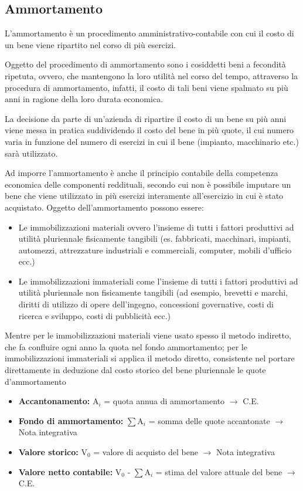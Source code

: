 \subsection{Ammortamento}
L'ammortamento è un procedimento amministrativo-contabile con cui il costo di un bene viene ripartito nel corso di più esercizi.

Oggetto del procedimento di ammortamento sono i cosiddetti beni a fecondità ripetuta, ovvero, che mantengono la loro utilità nel corso del tempo, attraverso la procedura di ammortamento, infatti, il costo di tali beni viene spalmato su più anni in ragione della loro durata economica.

La decisione da parte di un’azienda di ripartire il costo di un bene su più anni viene messa in pratica suddividendo il costo del bene in più quote, il cui numero varia in funzione del numero di esercizi in cui il bene (impianto, macchinario etc.) sarà utilizzato.

Ad imporre l’ammortamento è anche il principio contabile della competenza economica delle componenti reddituali, secondo cui non è possibile imputare un bene che viene utilizzato in più esercizi interamente all'esercizio in cui è stato acquistato.
Oggetto dell'ammortamento possono essere:
\begin{itemize}
	\item Le immobilizzazioni materiali ovvero l’insieme di tutti i fattori produttivi ad utilità pluriennale fisicamente tangibili (es. fabbricati, macchinari, impianti, automezzi, attrezzature industriali e commerciali, computer, mobili d'ufficio ecc.)
	\item Le immobilizzazioni immateriali come l’insieme di tutti i fattori produttivi ad utilità pluriennale non fisicamente tangibili (ad esempio, brevetti e marchi, diritti di utilizzo di opere dell'ingegno, concessioni governative, costi di ricerca e sviluppo, costi di pubblicità ecc.)
\end{itemize}
Mentre per le immobilizzazioni materiali viene usato spesso il metodo indiretto, che fa confluire ogni anno la quota nel fondo ammortamento; per le immobilizzazioni immateriali si applica il metodo diretto, consistente nel portare direttamente in deduzione dal costo storico del bene pluriennale le quote d'ammortamento

\begin{itemize}
	\item \textbf{Accantonamento:} A$_i$ = quota annua di ammortamento $\rightarrow$ C.E.
	\item \textbf{Fondo di ammortamento:} $\sum$A$_i$ = somma delle quote accantonate $\rightarrow$ Nota integrativa
	\item \textbf{Valore storico:} V$_0$ = valore di acquisto del bene $\rightarrow$ Nota integrativa
	\item \textbf{Valore netto contabile:} V$_0$ - $\sum$A$_i$ = stima del valore attuale del bene $\rightarrow$ C.E.
\end{itemize}

